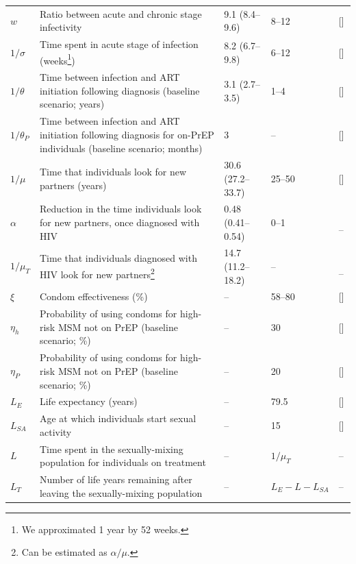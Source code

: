 \documentclass[12pt]{article}
\begin{document}
\begin{table}[H]
\begin{minipage}{\textwidth}
\begin{tabular}{l>{\raggedright}p{}l>{\raggedright}p{}l}
 	$w$ 			& Ratio between acute and chronic stage infectivity 	& 9.1 (8.4--9.6) & 8--12 & [\citenum{Patel2014}]\\ 
	$1/\sigma$ 	& Time spent in acute stage of infection (weeks\footnote{We approximated 1 year by 52 weeks.}) & 8.2 (6.7--9.8) & 6--12 & [\citenum{Lodi2011}]\\ 
	$1/\theta$		& Time between infection and {ART initiation following diagnosis} (baseline scenario; years)	& 3.1 (2.7--3.5) & 1--4 & [\citenum{Marty2019, Dabis_IAS2019}]\\
	$1/\theta_P$	& Time between infection {and ART initiation following diagnosis} for on-PrEP individuals (baseline scenario; months)	& 3 & -- & [\citenum{CNSANRS2015}]\\
	$1/\mu$ 		& {Time that individuals look for new partners (years)} & 30.6 (27.2--33.7) & 25--50 & [\citenum{Velter2015}]\\
	$\alpha$ 		& {Reduction in the time individuals look for new partners, once diagnosed with HIV} & 0.48 (0.41--0.54) & 0--1 & \,\, -- \\
	$1/ \mu_T$ 	& {Time that individuals diagnosed with HIV look for new partners}\footnote{Can be estimated as $\alpha/\mu$.} & 14.7 (11.2--18.2) & -- & \,\, -- \\ \midrule
	$\xi$			& Condom effectiveness (\%) & -- & 58--80 &[\citenum{Smith2015}]\\
	$\eta_h$		& Probability of using condoms for high-risk MSM not on PrEP (baseline scenario; \%) & -- & 30 & [\citenum{Molina2015}]\\
	$\eta_P$		& Probability of using condoms for high-risk MSM not on PrEP	(baseline scenario; \%) & -- & 20 & [\citenum{Molina2018}]\\ \midrule
	$L_E$		& Life expectancy (years) 	& -- & 79.5 & [\citenum{WHO_ART2016,INED_EspVieFrance}]\\
	$L_{SA}$	 	& Age at which individuals start sexual activity & -- & 15 & [\citenum{Velter2015}]\\
	$L$ 			& Time spent in the sexually-mixing population for individuals on treatment & -- & $1/ \mu_T$ & --\\
	$L_T$ 		& Number of life years remaining after leaving the sexually-mixing population & -- & $L_E - L - L_{SA}$ & --\\
	\bottomrule
	\end{tabular}
	\label{tab:Params}
\end{minipage}
\end{table}
\end{document}
